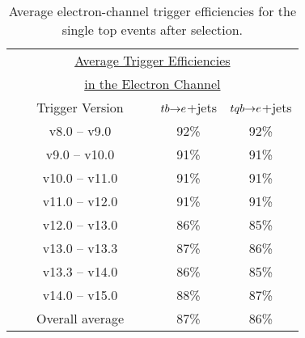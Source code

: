 \begin{table}[!h!tbp]
\begin{center}
\begin{minipage}{2.8in}
\begin{ruledtabular}
\begin{tabular}{c||cc} 
\multicolumn{3}{c}{\hspace{0.1in}\underline{Average Trigger Efficiencies}}\\
\multicolumn{3}{c}{\hspace{0.1in}\underline{in the Electron Channel}}\\
~~~ Trigger Version ~~~& $tb{\rightarrow}e$+jets & $tqb{\rightarrow}e$+jets \\
\hline
 v8.0 -- v9.0   &  92\%  &  92\%  \\            
 v9.0 -- v10.0  &  91\%  &  91\%  \\            
v10.0 -- v11.0  &  91\%  &  91\%  \\            
v11.0 -- v12.0  &  91\%  &  91\%  \\            
v12.0 -- v13.0  &  86\%  &  85\%  \\ 
v13.0 -- v13.3  &  87\%  &  86\%  \\            
v13.3 -- v14.0  &  86\%  &  85\%  \\         
v14.0 -- v15.0  &  88\%  &  87\%  \\
\hline		                
Overall average &  87\%  &  86\%
\end{tabular}
\end{ruledtabular}
\vspace{-0.1in}
\caption[eltriggerefficiencies]{Average electron-channel trigger
efficiencies for the single top events after selection.}
\label{eltrigger-efficiencies}
\end{minipage}
\end{center}
\end{table}



